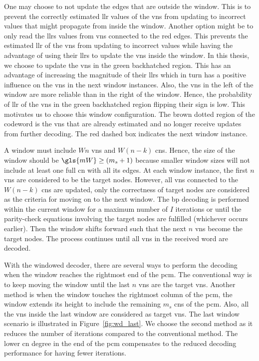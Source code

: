 One may choose to not update the edges that are outside the window. This is to prevent the correctly estimated \gls{llr} values of the \glspl{vn} from updating to incorrect values that might propagate from inside the window. Another option might be to only read the \glspl{llr} values from \glspl{vn} connected to the red edges. This prevents the estimated \gls{llr} of the \glspl{vn} from updating to incorrect values while having the advantage of using their \glspl{llr} to update the \glspl{vn} inside the window. In this thesis, we choose to update the \glspl{vn} in the green backhatched region. This has an advantage of increasing the magnitude of their \glspl{llr} which in turn has a positive influence on the \glspl{vn} in the next window instances. Also, the \glspl{vn} in the left of the window are more reliable than in the right of the window. Hence, the probability of \gls{llr} of  the \glspl{vn} in the green backhatched region flipping their sign is low. This motivates us to choose this window configuration. The brown dotted region of the codeword is the \glspl{vn} that are already estimated and no longer receive updates from further decoding. The red dashed box indicates the next window instance. 

A window must include $Wn$ \glspl{vn} and $W(n-k)$ \glspl{cn}. Hence, the size of the window should be $\gls{mW}\geq (m_s+1)$ because smaller window sizes will not include at least one full \gls{cn} with all its edges. At each window instance, the first $n$ \glspl{vn} are considered to be the target nodes. However, all \glspl{vn} connected to the $W(n-k)$ \glspl{cn} are updated, only the correctness of target nodes are considered as the criteria for moving on to the next window. The \gls{bp} decoding is performed within the current window for a maximum number of $I$ iterations or until the parity-check equations involving the target nodes are fulfilled (whichever occurs earlier). Then the window shifts forward such that the next $n$ \glspl{vn} become the target nodes. The process continues until all \glspl{vn} in the received word are decoded.

With the windowed decoder, there are several ways to perform the decoding when the window reaches the rightmost end of the \gls{pcm}. The conventional way is to keep moving the window until the last $n$ \glspl{vn} are the target \glspl{vn}. Another method is when the window touches the rightmost column of the \gls{pcm}, the window extends its height to include the remaining $m_s$ \glspl{cn} of the \gls{pcm}. Also, all the \glspl{vn} inside the last window are considered as target \glspl{vn}. The last window scenario is illustrated in Figure~\ref{fig:wd_last}. We choose the second method as it reduces the number of iterations compared to the conventional method. The lower \gls{cn} degree in the end of the \gls{pcm} compensates to the reduced decoding performance for having fewer iterations.

